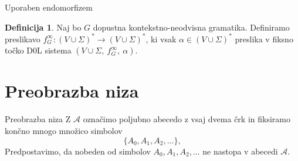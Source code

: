 \documentclass{beamer}
\newcommand{\A}{\mathcal{A}}
\theoremstyle{definition} %
\newtheorem{definicija}{Definicija}[section]
\newtheorem{izrek}[definicija]{Izrek}
\begin{document}
\begin{frame}{Uporaben endomorfizem}
    \begin{definicija}
        Naj bo $G$ dopustna kontekstno-neodvisna gramatika. Definiramo preslikavo
        $ f_G^\infty \colon (V \cup \Sigma)^* \to (V \cup \Sigma)^* $, ki vsak 
        $ \alpha \in (V \cup \Sigma)^* $ preslika v fiksno točko D0L sistema $ (V \cup \Sigma, \ f_G^\infty, \ \alpha) $.
    \end{definicija}
\end{frame}


\section{Preobrazba niza}

\begin{frame}{Preobrazba niza}
    \pause
    Z $\A$ označimo poljubno abecedo z vsaj dvema črk
    in fiksiramo končno mnogo množico simbolov
    \[
        \{A_0, A_1, A_2, \ldots \},
    \]
    Predpostavimo, da nobeden
    od simbolov $ A_0, A_1, A_2, \ldots $ ne nastopa v abecedi $\A$.
\end{frame}
\end{document}
